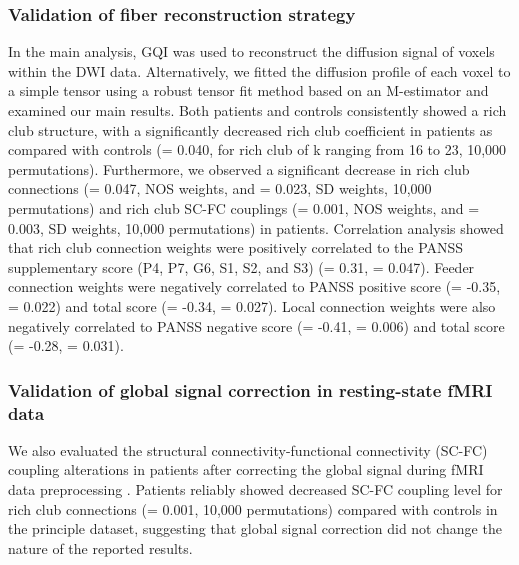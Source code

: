 \begin{refsection}
\subsubsection*{Validation of fiber reconstruction strategy}
In the main analysis, GQI \citep{YEH2010} was used to reconstruct the diffusion signal of voxels within the DWI data. Alternatively, we fitted the diffusion profile of each voxel to a simple tensor using a robust tensor fit method based on an M-estimator \citep{Chang2005RESTORERE} and examined our main results. Both patients and controls consistently showed a rich club structure, with a significantly decreased rich club coefficient in patients as compared with controls (\pval = 0.040, for rich club of k ranging from 16 to 23, 10,000 permutations). Furthermore, we observed a significant decrease in rich club connections (\pval = 0.047, NOS weights, and \pval = 0.023, SD weights, 10,000 permutations) and rich club SC-FC couplings (\pval = 0.001, NOS weights, and \pval = 0.003, SD weights, 10,000 permutations) in patients. Correlation analysis showed that rich club connection weights were positively correlated to the PANSS supplementary score (P4, P7, G6, S1, S2, and S3) (\rval = 0.31, \pval = 0.047). Feeder connection weights were negatively correlated to PANSS positive score (\rval = -0.35, \pval = 0.022) and total score (\pval = -0.34, \pval = 0.027). Local connection weights were also negatively correlated to PANSS negative score (\rval = -0.41, \pval = 0.006) and total score (\pval = -0.28, \pval = 0.031).

\subsubsection*{Validation of global signal correction in resting-state fMRI data}
We also evaluated the structural connectivity-functional connectivity (SC-FC) coupling alterations in patients after correcting the global signal during fMRI data preprocessing \citep{Murphy2017TowardsAC}. Patients reliably showed decreased SC-FC coupling level for rich club connections (\pval = 0.001, 10,000 permutations) compared with controls in the principle dataset, suggesting that global signal correction did not change the nature of the reported results.


\end{refsection}
